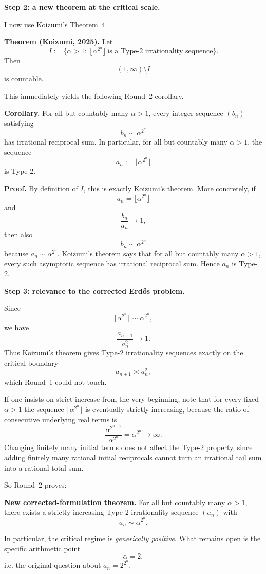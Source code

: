 \medskip
\noindent
\textbf{Step 2: a new theorem at the critical scale.}

I now use Koizumi's Theorem~4.

\medskip
\noindent
\textbf{Theorem (Koizumi, 2025).}
Let
\[
I:=\{\alpha>1:\ \lfloor \alpha^{2^n}\rfloor\ \text{is a Type-2 irrationality sequence}\}.
\]
Then
\[
(1,\infty)\setminus I
\]
is countable.

\medskip
\noindent
This immediately yields the following Round~2 corollary.

\medskip
\noindent
\textbf{Corollary.}
For all but countably many $\alpha>1$, every integer sequence $(b_n)$ satisfying
\[
b_n\sim \alpha^{2^n}
\]
has irrational reciprocal sum.  In particular, for all but countably many $\alpha>1$, the sequence
\[
a_n:=\lfloor \alpha^{2^n}\rfloor
\]
is Type-2.

\medskip
\noindent
\textbf{Proof.}
By definition of $I$, this is exactly Koizumi's theorem.  More concretely, if
\[
a_n=\lfloor \alpha^{2^n}\rfloor
\]
and
\[
\frac{b_n}{a_n}\to 1,
\]
then also
\[
b_n\sim \alpha^{2^n}
\]
because $a_n\sim \alpha^{2^n}$.  Koizumi's theorem says that for all but countably many $\alpha>1$, every such asymptotic sequence has irrational reciprocal sum.  Hence $a_n$ is Type-2.

\medskip
\noindent
\textbf{Step 3: relevance to the corrected Erd\H{o}s problem.}

Since
\[
\lfloor \alpha^{2^n}\rfloor \sim \alpha^{2^n},
\]
we have
\[
\frac{a_{n+1}}{a_n^2}\to 1.
\]
Thus Koizumi's theorem gives Type-2 irrationality sequences exactly on the critical boundary
\[
a_{n+1}\asymp a_n^2,
\]
which Round~1 could not touch.

If one insists on strict increase from the very beginning, note that for every fixed $\alpha>1$ the sequence $\lfloor \alpha^{2^n}\rfloor$ is eventually strictly increasing, because the ratio of consecutive underlying real terms is
\[
\frac{\alpha^{2^{n+1}}}{\alpha^{2^n}}=\alpha^{2^n}\to\infty.
\]
Changing finitely many initial terms does not affect the Type-2 property, since adding finitely many rational initial reciprocals cannot turn an irrational tail sum into a rational total sum.

So Round~2 proves:

\medskip
\noindent
\textbf{New corrected-formulation theorem.}
For all but countably many $\alpha>1$, there exists a strictly increasing Type-2 irrationality sequence $(a_n)$ with
\[
a_n\sim \alpha^{2^n}.
\]

\medskip
\noindent
In particular, the critical regime is \emph{generically positive}.  What remains open is the specific arithmetic point
\[
\alpha=2,
\]
i.e. the original question about $a_n=2^{2^n}$.

